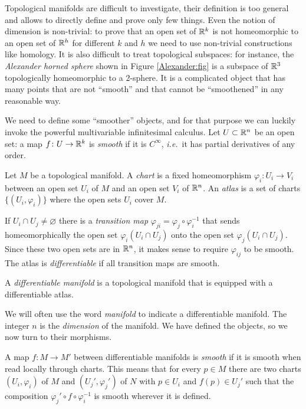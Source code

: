 Topological manifolds are difficult to investigate, their definition is too general and allows to directly define and prove only few things. Even the notion of dimension is non-trivial: to prove that an open set of $\mathbb{R}^k$ is not homeomorphic to an open set of $\mathbb{R}^h$ for different $k$ and $h$ we need to use non-trivial constructions like homology. It is also difficult to treat topological subspaces: for instance, the \emph{Alexander horned sphere} shown in Figure \ref{Alexander:fig} is a subspace of $\mathbb{R}^3$ topologically homeomorphic to a 2-sphere. It is a complicated object that has many points that are not ``smooth'' and that cannot be ``smoothened'' in any reasonable way.

We need to define some ``smoother'' objects, and for that purpose we can luckily invoke the powerful multivariable infinitesimal calculus. Let $U\subset \mathbb{R}^n$ be an open set: a map $f\colon U\to \mathbb{R}^k$ is  \emph{smooth} if it is $C^\infty$, \emph{i.e.}~it has partial derivatives of any order.

\begin{defn} Let $M$ be a topological manifold.
A \emph{chart} is a fixed homeomorphism $\varphi_i\colon U_i \to V_i$ between an open set $U_i$ of $M$ and an open set $V_i$ of $\mathbb{R}^n$. An \emph{atlas} is a set of charts $\big\{(U_i, \varphi_i)\big\}$ where the open sets $U_i$ cover $M$. 

If $U_i\cap U_j\neq\varnothing$ there is a \emph{transition map} $\varphi_{ji} = \varphi_j\circ \varphi_i^{-1}$ that sends homeomorphically the open set $\varphi_i({U_i\cap U_j})$ onto the open set $\varphi_j({U_i\cap U_j})$. Since these two open sets are in $\mathbb{R}^n$, it makes sense to require $\varphi_{ij}$ to be smooth. The atlas is \emph{differentiable} if all transition maps are smooth. 
\end{defn}

\begin{defn}
A \emph{differentiable manifold} is a topological manifold that is equipped with a differentiable atlas.
\end{defn}

We will often use the word \emph{manifold} to indicate a differentiable manifold.
The integer $n$ is the \emph{dimension} of the manifold. We have defined the objects, so we now turn to their morphisms. 

\begin{defn}
A map $f\colon M \to M'$ between differentiable manifolds is \emph{smooth} if it is smooth when read locally through charts. This means that for every $p \in M$ there are two charts $(U_i, \varphi_i)$ of $M$ and $(U_j', \varphi_j')$ of $N$ with $p\in U_i$ and $f(p)\in U_j'$ such that the composition
$\varphi_j'\circ f \circ \varphi_i^{-1}$ is smooth wherever it is defined. 
\end{defn}

